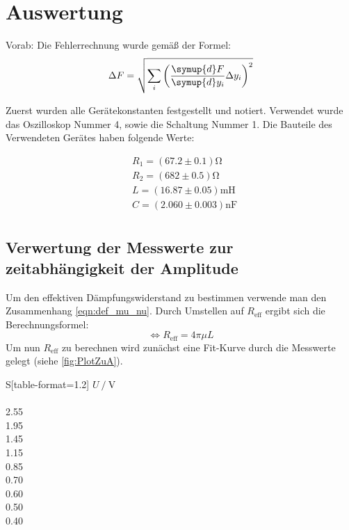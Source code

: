 \section{Auswertung}
\label{sec:Auswertung}
Vorab: Die Fehlerrechnung wurde gemäß der Formel:
\begin{equation}
  \label{eqn:Gauss}
  \Delta F = \sqrt{\sum_i\left(\frac{\symup{d}F}{\symup{d}y_i}\Delta y_i \right)^2}
\end{equation}

Zuerst wurden alle Gerätekonstanten festgestellt und notiert. Verwendet wurde das Oszilloskop Nummer 4, sowie
die Schaltung Nummer 1. Die Bauteile des Verwendeten Gerätes haben folgende Werte:

\begin{align*}
  &R_1 = (67.2 \pm 0.1) \unit{\ohm} \\
  &R_2 = (682 \pm 0.5) \unit{\ohm}  \\
  &L   = (16.87 \pm 0.05) \unit{\milli\henry} \\
  &C   = (2.060 \pm 0.003) \unit{\nano\farad} \\
\end{align*}

\subsection{Verwertung der Messwerte zur zeitabhängigkeit der Amplitude}
\label{subsec:AuswertungA}

Um den effektiven Dämpfungswiderstand zu bestimmen verwende man den Zusammenhang \eqref{eqn:def_mu_nu}.
Durch Umstellen auf $R_{\text{eff}}$ ergibt sich die Berechnungsformel:
\begin{equation}
  \label{Abklingdauer1}
  \Longleftrightarrow R_{\text{eff}} = 4\pi\mu L
\end{equation}
Um nun $R_{\text{eff}}$ zu berechnen wird zunächst eine Fit-Kurve durch die Messwerte gelegt (siehe \autoref{fig:PlotZuA}).

\begin{table}
  \centering
  \caption{Messdaten zur Zeitabhängigkeit der Amplitude.}
  \label{tab:Mess1}
  \begin{tabular}{S[table-format=1.2]}
      \toprule
      $U \mathbin{/} \unit{\volt}$ \\
       \\
      2.55 \\
      1.95 \\
      1.45 \\
      1.15 \\
      0.85 \\
      0.70 \\
      0.60 \\
      0.50 \\
      0.40 \\
  \bottomrule 
  \end{tabular}
\end{table}

